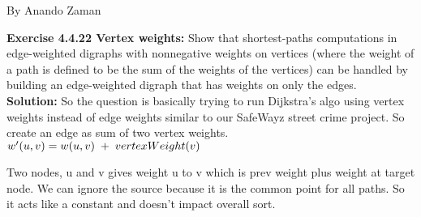 \documentclass[11pt,fleqn]{article}
\begin{document}
By Anando Zaman


\textbf{Exercise 4.4.22 Vertex weights:}  Show that shortest-paths computations in edge-weighted digraphs
with nonnegative weights on vertices (where the weight of a path is defined to
be the sum of the weights of the vertices) can be handled by building an edge-weighted
digraph that has weights on only the edges.\\

\textbf{Solution:} So the question is basically trying to run Dijkstra's algo using vertex weights instead of edge weights similar to our SafeWayz street crime project. So create an edge as sum of two vertex weights.\\

$w'(u,v)=w(u,v) \thickspace + \thickspace vertexWeight(v)$

Two nodes, u and v gives weight u to v which is prev weight plus weight at target node. We can ignore the source because it is the common point for all paths. So it acts like a constant and doesn't impact overall sort.


	
\end{document}
